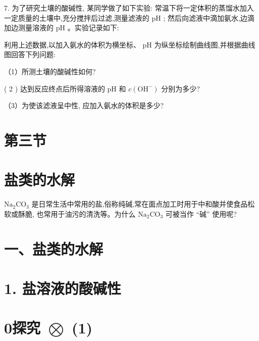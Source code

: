 \documentclass[10pt]{article}
\begin{document}
7. 为了研究土壤的酸碱性, 某同学做了如下实验: 常温下将一定体积的蒸馏水加入一定质量的土壤中,充分搅拌后过滤,测量滤液的 \(\mathrm{{pH}}\) ; 然后向滤液中滴加氨水,边滴加边测量溶液的 \(\mathrm{{pH}}\) 。实验记录如下:

\begin{center}
\end{center}

利用上述数据,以加入氨水的体积为横坐标、 \(\mathrm{{pH}}\) 为纵坐标绘制曲线图,并根据曲线图回答下列问题:

（1）所测土壤的酸碱性如何?

( 2 ) 达到反应终点后所得溶液的 \(\mathrm{{pH}}\) 和 \(c\left( {\mathrm{{OH}}}^{ - }\right)\) 分别为多少?

（3）为使该滤液呈中性, 应加入氨水的体积是多少?

\section*{第三节}

\section*{盐类的水解}

\({\mathrm{{Na}}}_{2}{\mathrm{{CO}}}_{3}\) 是日常生活中常用的盐,俗称纯碱,常在面点加工时用于中和酸并使食品松软或酥脆, 也常用于油污的清洗等。为什么 \({\mathrm{{Na}}}_{2}{\mathrm{{CO}}}_{3}\) 可被当作 “碱” 使用呢?

\section*{一、盐类的水解}

\section*{1. 盐溶液的酸碱性}

\section*{0探究 \(\bigotimes\) (1)}
\end{document}
